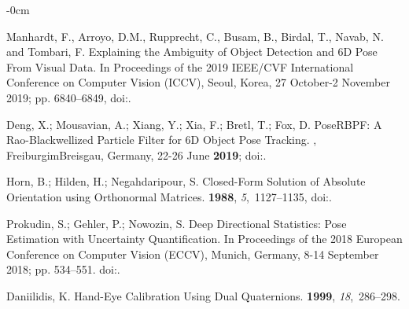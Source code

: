 \documentclass[micromachines,article,accept,pdftex,moreauthors]{Definitions/mdpi}
\begin{document}
\begin{adjustwidth}{-\extralength}{0cm}
\begin{thebibliography}{999}
{Manhardt, F., Arroyo, D.M., Rupprecht, C., Busam, B., Birdal, T., Navab, N. and Tombari, F.}
\newblock Explaining the Ambiguity of Object Detection and 6D Pose From Visual Data.
\newblock In Proceedings of the  2019 IEEE/CVF International Conference on Computer Vision {(ICCV), Seoul, Korea, 27 October-2 November 2019;} pp. 6840--6849,
\newblock
doi:{\href{https://doi.org/10.1109/ICCV.2019.00694}{}}.

Deng, X.; Mousavian, A.; Xiang, Y.; Xia, F.; Bretl, T.; Fox, D.
\newblock PoseRBPF: A Rao-Blackwellized Particle Filter for 6D Object Pose Tracking.
, {FreiburgimBreisgau, Germany, 22-26 June} \textbf{{2019}};
\newblock
doi:{\href{https://doi.org/10.15607/RSS.2019.XV.049}{}}.

Horn, B.; Hilden, H.; Negahdaripour, S.
\newblock Closed-Form Solution of Absolute Orientation using Orthonormal Matrices.
 {\bf 1988}, {\em 5},~1127--1135,
\newblock
doi:{\href{https://doi.org/10.1364/JOSAA.5.001127}{}}.

Prokudin, S.; Gehler, P.; Nowozin, S.
\newblock Deep Directional Statistics: Pose Estimation with Uncertainty Quantification.
\newblock In Proceedings of the  2018 European Conference on Computer Vision {(ECCV), Munich, Germany, 8-14 September 2018;} pp. 534--551.
\newblock
doi:{\href{https://doi.org/10.1007/978-3-030-01240-3_33}{}}.

Daniilidis, K.
\newblock Hand-{{Eye Calibration Using Dual Quaternions}}.
 {\bf 1999}, {\em 18},~286--298.


\end{thebibliography}
\end{adjustwidth}
\end{document}
